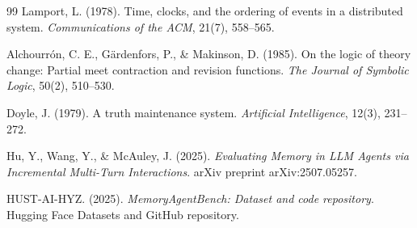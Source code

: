 \documentclass[12pt,a4paper]{article}
\begin{document}
\begin{thebibliography}{99}
Lamport, L. (1978).
Time, clocks, and the ordering of events in a distributed system.
\textit{Communications of the ACM}, 21(7), 558--565.

Alchourrón, C. E., Gärdenfors, P., \& Makinson, D. (1985).
On the logic of theory change: Partial meet contraction and revision functions.
\textit{The Journal of Symbolic Logic}, 50(2), 510--530.

Doyle, J. (1979).
A truth maintenance system.
\textit{Artificial Intelligence}, 12(3), 231--272.

Hu, Y., Wang, Y., \& McAuley, J. (2025).
\textit{Evaluating Memory in LLM Agents via Incremental Multi-Turn Interactions}.
arXiv preprint arXiv:2507.05257.

HUST-AI-HYZ. (2025).
\textit{MemoryAgentBench: Dataset and code repository}.
Hugging Face Datasets and GitHub repository.

\end{thebibliography}
\end{document}
